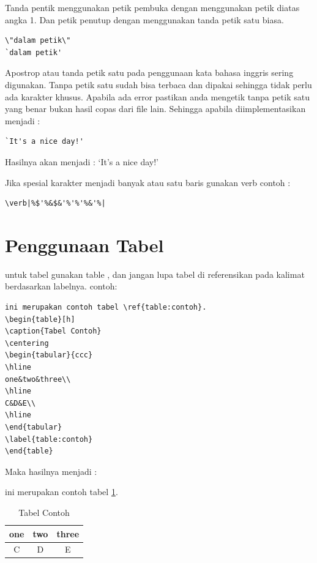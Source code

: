 Tanda pentik menggunakan petik pembuka dengan menggunakan petik diatas angka 1. 
Dan petik penutup dengan menggunakan tanda petik satu biasa.
\begin{verbatim}
\"dalam petik\"
`dalam petik'
\end{verbatim} 
Apostrop atau tanda petik satu pada penggunaan kata bahasa inggris sering digunakan. Tanpa petik satu sudah bisa terbaca dan dipakai sehingga tidak perlu ada karakter khusus. Apabila ada error pastikan anda mengetik tanpa petik satu yang benar bukan hasil copas dari file lain. Sehingga apabila diimplementasikan menjadi :
\begin{verbatim}
`It's a nice day!'
\end{verbatim} 
Hasilnya akan menjadi : `It's a nice day!'

Jika spesial karakter menjadi banyak atau satu baris gunakan verb
contoh :
\begin{verbatim}
\verb|%$'%&$&'%'%'%&'%|
\end{verbatim}

\section{Penggunaan Tabel}

untuk tabel gunakan table , dan jangan lupa tabel di referensikan pada kalimat berdasarkan labelnya. 
contoh:
\begin{verbatim}
ini merupakan contoh tabel \ref{table:contoh}.
\begin{table}[h]
\caption{Tabel Contoh}
\centering
\begin{tabular}{ccc}
\hline
one&two&three\\
\hline
C&D&E\\
\hline
\end{tabular}
\label{table:contoh}
\end{table}
\end{verbatim}

Maka hasilnya menjadi :

ini merupakan contoh tabel \ref{table:sebuahcontoh1}.
\begin{table}[h]
\caption{Tabel Contoh}
\centering
\begin{tabular}{ccc}
\hline
one&two&three\\
\hline
C&D&E\\
\hline
\end{tabular}
\label{table:sebuahcontoh1}
\end{table}

